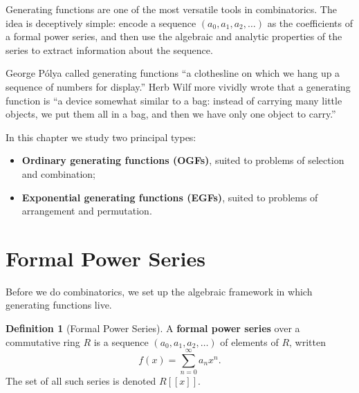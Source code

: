 \documentclass[12pt,a4paper,openany]{book}
\theoremstyle{definition}
\newtheorem{definition}{Definition}[chapter]
\theoremstyle{plain}
\theoremstyle{remark}
\begin{document}

Generating functions are one of the most versatile tools in
combinatorics.  The idea is deceptively simple: encode a sequence
$(a_0, a_1, a_2, \dots)$ as the coefficients of a formal power series,
and then use the algebraic and analytic properties of the series to
extract information about the sequence.

George P\'olya called generating functions
``a clothesline on which we hang up a sequence of numbers for display.''
Herb Wilf more vividly wrote that a generating
function is ``a device somewhat similar to a bag: instead of carrying
many little objects, we put them all in a bag, and then we have only
one object to carry.''

In this chapter we study two principal types:
\begin{itemize}
  \item \textbf{Ordinary generating functions (OGFs)}, suited to
    problems of selection and combination;
  \item \textbf{Exponential generating functions (EGFs)}, suited to
    problems of arrangement and permutation.
\end{itemize}



\section{Formal Power Series}\label{sec:formal-power-series}

Before we do combinatorics, we set up the algebraic framework in which
generating functions live.

\begin{definition}[Formal Power Series]\label{def:fps}
A \textbf{formal power series} over a commutative ring $R$ is a
sequence $(a_0, a_1, a_2, \dots)$ of elements of $R$, written
\[
  f(x) = \sum_{n=0}^{\infty} a_n x^n.
\]
The set of all such series is denoted $R[[x]]$.
\end{definition}
\end{document}

